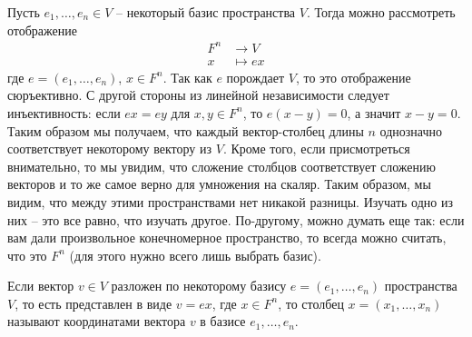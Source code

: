 Пусть $e_1,\ldots,e_n\in V$ -- некоторый базис пространства $V$.
Тогда можно рассмотреть отображение 
\begin{align*}
F^n &\to V\\
x &\mapsto ex
\end{align*}
где $e=(e_1,\ldots,e_n)$, $x\in F^n$.
Так как $e$ порождает $V$, то это отображение сюръективно.
С другой стороны из линейной независимости следует инъективность: если $ex = ey$ для $x,y\in F^n$, то $e (x - y) = 0$, а значит $ x - y = 0$.
Таким образом мы получаем, что каждый вектор-столбец длины $n$ однозначно соответствует некоторому вектору из $V$.
Кроме того, если присмотреться внимательно, то мы увидим, что сложение столбцов соответствует сложению векторов и то же самое верно для умножения на скаляр.
Таким образом, мы видим, что между этими пространствами нет никакой разницы.
Изучать одно из них -- это все равно, что изучать другое.
По-другому, можно думать еще так: если вам дали произвольное конечномерное пространство, то всегда можно считать, что это $F^n$ (для этого нужно всего лишь выбрать базис).

\begin{definition}
\label{definition::Coordinates}
Если вектор $v\in V$ разложен по некоторому базису $e = (e_1,\ldots,e_n)$ пространства $V$, то есть представлен в виде $v = ex$, где $x\in F^n$, то столбец $x = (x_1,\ldots,x_n)$ называют координатами вектора $v$ в базисе $e_1,\ldots, e_n$.
\end{definition}
